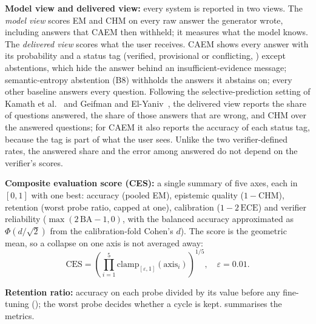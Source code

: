 \textbf{Model view and delivered view:} every system is reported in two views. The \emph{model view} scores EM and CHM on every raw answer the generator wrote, including answers that CAEM then withheld; it measures what the model knows. The \emph{delivered view} scores what the user receives. CAEM shows every answer with its probability and a status tag (verified, provisional or conflicting, ) except abstentions, which hide the answer behind an insufficient-evidence message; semantic-entropy abstention (B8) withholds the answers it abstains on; every other baseline answers every question. Following the selective-prediction setting of Kamath et al.~\cite{kamath2020selective} and Geifman and El-Yaniv~\cite{geifman2017selective}, the delivered view reports the share of questions answered, the share of those answers that are wrong, and CHM over the answered questions; for CAEM it also reports the accuracy of each status tag, because the tag is part of what the user sees. Unlike the two verifier-defined rates, the answered share and the error among answered do not depend on the verifier's scores.

\textbf{Composite evaluation score (CES):} a single summary of five axes, each in $[0,1]$ with one best: accuracy (pooled EM), epistemic quality ($1 - \mathrm{CHM}$), retention (worst probe ratio, capped at one), calibration ($1 - 2\,\mathrm{ECE}$) and verifier reliability ($\max(2\,\mathrm{BA} - 1, 0)$, with the balanced accuracy approximated as $\Phi(d/\sqrt{2})$ from the calibration-fold Cohen's $d$). The score is the geometric mean, so a collapse on one axis is not averaged away:
\begin{equation}
\mathrm{CES} = \left(\prod_{i=1}^{5} \mathrm{clamp}_{[\varepsilon,1]}(\mathrm{axis}_i)\right)^{1/5}, \quad \varepsilon = 0.01.
\label{eq:ces}
\end{equation}

\textbf{Retention ratio:} accuracy on each probe divided by its value before any fine-tuning (); the worst probe decides whether a cycle is kept.  summarises the metrics.

